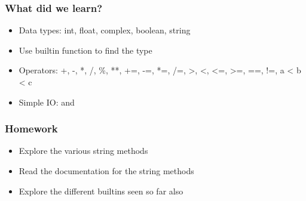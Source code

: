 \documentclass[14pt,compress]{beamer}
\begin{document}
\begin{frame}[fragile]
  \frametitle{What did we learn?}
  \begin{itemize}
  \item Data types: int, float, complex, boolean, string
  \item Use  builtin function to find the type
  \item Operators: +, -, *, /, \%, **, +=, -=, *=, /=, >, <, <=, >=, ==, !=, a < b < c
  \item Simple IO:  and 
  \end{itemize}
\end{frame}

\begin{frame}
  \frametitle{Homework}
  \begin{itemize}
  \item Explore the various string methods
  \item Read the documentation for the string methods
  \item Explore the different builtins seen so far also
  \end{itemize}
\end{frame}
\end{document}

